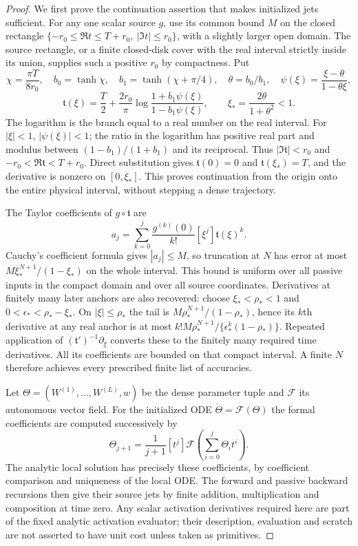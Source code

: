\begin{proof}
We first prove the continuation assertion that makes initialized jets
sufficient. For any one scalar source $g$, use its common bound $M$
on the closed rectangle
$\{-r_0\le\Re t\le T+r_0,\ |\Im t|\le r_0\}$, with a slightly
larger open domain. The source rectangle, or a finite closed-disk cover
with the real interval strictly inside its union, supplies such a
positive $r_0$ by compactness. Put
\[
 \chi=\frac{\pi T}{8r_0},\quad b_0=\tanh\chi,\quad
 b_1=\tanh(\chi+\pi/4),\quad \theta=b_0/b_1,
 \quad \psi(\xi)=\frac{\xi-\theta}{1-\theta\xi},
\]
\[
 \mathfrak t(\xi)=\frac T2+\frac{2r_0}{\pi}
       \log\frac{1+b_1\psi(\xi)}{1-b_1\psi(\xi)},
 \qquad \xi_*=\frac{2\theta}{1+\theta^2}<1.
\]
The logarithm is the branch equal to a real number on the real
interval. For $|\xi|<1$, $|\psi(\xi)|<1$; the ratio in the logarithm
has positive real part and modulus between
$(1-b_1)/(1+b_1)$ and its reciprocal. Thus
$|\Im\mathfrak t|<r_0$ and
$-r_0<\Re\mathfrak t<T+r_0$.
Direct substitution gives $\mathfrak t(0)=0$ and
$\mathfrak t(\xi_*)=T$, and the derivative is nonzero on
$[0,\xi_*]$. This proves continuation from the origin onto the
entire physical interval, without stepping a dense trajectory.

The Taylor coefficients of $g\circ\mathfrak t$ are
\[
 a_j=\sum_{k=0}^j\frac{g^{(k)}(0)}{k!}
                       [\xi^j]\mathfrak t(\xi)^k.
\]
Cauchy's coefficient formula gives $|a_j|\le M$, so truncation at
$N$ has error at most $M\xi_*^{N+1}/(1-\xi_*)$ on the whole interval.
This bound is uniform over all passive inputs in the compact domain
and over all source coordinates. Derivatives at finitely many later
anchors are also recovered: choose $\xi_*<\rho_*<1$ and
$0<\epsilon_*<\rho_*-\xi_*$. On $|\xi|\le\rho_*$ the tail is
$M\rho_*^{N+1}/(1-\rho_*)$, hence its $k$th derivative at any real
anchor is at most
$k!M\rho_*^{N+1}/\{\epsilon_*^k(1-\rho_*)\}$.
Repeated application of $(\mathfrak t')^{-1}\partial_\xi$ converts
these to the finitely many required time derivatives. All its
coefficients are bounded on that compact interval. A finite $N$
therefore achieves every prescribed finite list of accuracies.

Let $\Theta=(W^{(1)},\ldots,W^{(L)},w)$ be the dense parameter tuple
and $\mathcal F$ its autonomous vector field. For the initialized ODE
$\dot\Theta=\mathcal F(\Theta)$ the formal
coefficients are computed successively by
\[
 \Theta_{j+1}=\frac1{j+1}[t^j]
          \mathcal F\!\left(\sum_{i=0}^j\Theta_i t^i\right).
\]
The analytic local solution has precisely these coefficients, by
coefficient comparison and uniqueness of the local ODE. The forward
and passive backward recursions then give their source jets by finite
addition, multiplication and composition at time zero. Any scalar
activation derivatives required here are part of the fixed analytic
activation evaluator; their description, evaluation and scratch are
not asserted to have unit cost unless taken as primitives.


\end{proof}
